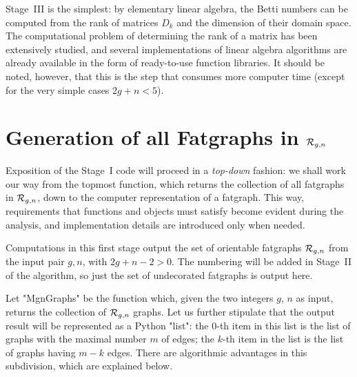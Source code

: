 Stage~III is the simplest: by elementary linear algebra, the Betti
numbers can be computed from the rank of matrices $D_k$ and the
dimension of their domain space.  The computational problem of
determining the rank of a matrix has been extensively studied, and
several implementations of linear algebra algorithms are already
available in the form of ready-to-use function libraries. It should
be noted, however, that this is the step that consumes more computer
time (except for the very simple cases $2g+n<5$).


\section[Generation of fatgraphs]{Generation of all Fatgraphs in $\mathcal{R}_{g,n}$}
\label{sec:generation}

Exposition of the Stage~I code will proceed in a \emph{top-down}
fashion: we shall work our way from the topmost function, which
returns the collection of all fatgraphs in $\mathcal{R}_{g,n}$, down to the
computer representation of a fatgraph.  This way, requirements that
functions and objects must satisfy become evident during the analysis,
and implementation details are introduced only when needed.

Computations in this first stage output the set of orientable
fatgraphs $\mathcal{R}_{g,n}$ from the input pair $g, n$, with $2g +n - 2 > 0$.
The numbering will be added in Stage~II of the algorithm, so just the
set of undecorated fatgraphs is output here.

Let "MgnGraphs" be the function which, given the two integers $g$,
$n$ as input, returns the collection of $\mathcal{R}_{g,n}$ graphs.  Let us
further stipulate that the output result will be represented as a
Python "list": the $0$-th item in this list is the list of graphs
with the maximal number $m$ of edges; the $k$-th item in the list is
the list of graphs having $m - k$ edges.  There are algorithmic
advantages in this subdivision, which are explained below.


